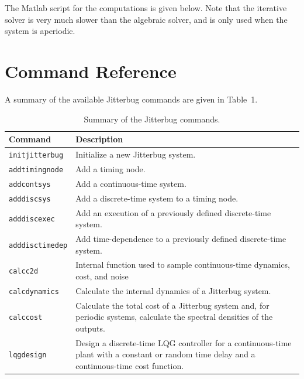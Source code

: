 \documentclass[final,twoside]{rapport}  %
\begin{document}
The Matlab script for the computations is given below. 
Note that the iterative solver is very much slower than the algebraic
solver, and is only used when the system is aperiodic.

\begin{small}

\end{small}



\section{Command Reference}

A summary of the available {\sc Jitterbug} commands are given in
Table~1.

\begin{table}[htbp]
\label{table:commands}
\begin{center}
\begin{tabularx}{\hsize}{|l|>{\raggedright\arraybackslash}X|}
\hline
Command & Description \\ \hline
{\tt initjitterbug} & Initialize a new {\sc Jitterbug} system. \\
{\tt addtimingnode} & Add a timing node. \\
{\tt addcontsys} & Add a continuous-time system. \\
{\tt adddiscsys} & Add a discrete-time system to a timing node. \\
{\tt adddiscexec} & Add an execution of a previously defined
discrete-time system. \\
{\tt adddisctimedep} & Add time-dependence to a previously defined
discrete-time system. \\
{\tt calcc2d} & Internal function used to sample continuous-time
dynamics, cost, and noise\\ 
{\tt calcdynamics} & Calculate the internal dynamics of a {\sc Jitterbug} system. \\
{\tt calccost} & Calculate the total cost of a {\sc Jitterbug} system
and, for periodic systems, calculate the spectral densities of the outputs. \\
{\tt lqgdesign} & Design a discrete-time LQG controller for 
a continuous-time plant with a constant or random time delay and a
continuous-time cost function.\\ \hline
\end{tabularx}
\end{center}
\caption{Summary of the {\sc Jitterbug} commands.}
\end{table}
\end{document}
